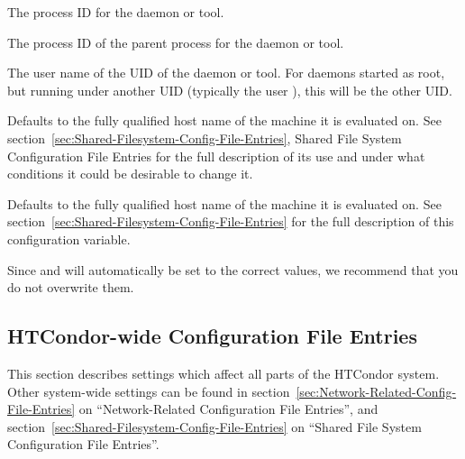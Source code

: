 \begin{description}
\label{param:Pid}
\item[\MacroU{PID}]
  The process ID for the daemon or tool.

\label{param:Ppid}
\item[\MacroU{PPID}]
  The process ID of the parent process for the daemon or tool.

\label{param:Username}
\item[\MacroU{USERNAME}]
  The user name of the UID of the daemon or tool.
  For daemons started as root, but running under another UID
  (typically the user ), this will be the other UID.

\label{param:FilesystemDomain}
\item[\MacroU{FILESYSTEM\_DOMAIN}]
  Defaults to the fully
  qualified host name of the machine it is evaluated on.  See
  section~\ref{sec:Shared-Filesystem-Config-File-Entries}, Shared
  File System Configuration File Entries for the full description of
  its use and under what conditions it could be desirable to change it.

\label{param:UIDDomain}
\item[\MacroU{UID\_DOMAIN}]
  Defaults to the fully
  qualified host name of the machine it is evaluated on.  See
  section~\ref{sec:Shared-Filesystem-Config-File-Entries} 
  for the full description of this configuration variable.

\end{description}

Since  and  will automatically be set to the
correct values, we recommend that you do not overwrite them.

\subsection{\label{sec:HTCondor-wide-Config-File-Entries}HTCondor-wide Configuration File Entries} 


This section describes settings which affect all parts of the HTCondor
system. 
Other system-wide settings can be found in
section~\ref{sec:Network-Related-Config-File-Entries} on
``Network-Related Configuration File Entries'', and
section~\ref{sec:Shared-Filesystem-Config-File-Entries} on ``Shared
File System Configuration File Entries''. 


